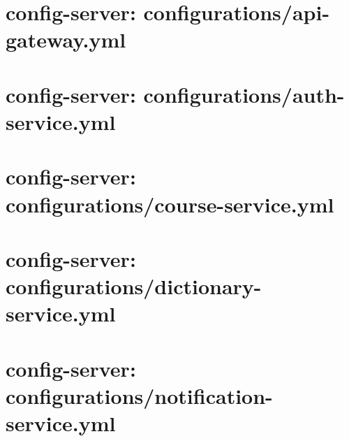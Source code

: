 \section*{config-server: configurations/api-gateway.yml}


\section*{config-server: configurations/auth-service.yml}


\section*{config-server: configurations/course-service.yml}


\section*{config-server: configurations/dictionary-service.yml}


\section*{config-server: configurations/notification-service.yml}

